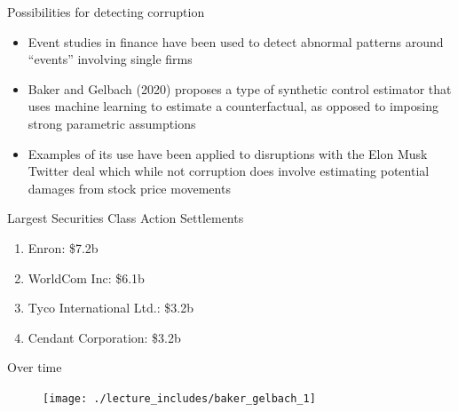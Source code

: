 \documentclass{beamer}
\begin{document}
\begin{frame}{Possibilities for detecting corruption}

\begin{itemize}

\item Event studies in finance have been used to detect abnormal patterns around ``events'' involving single firms
\item Baker and Gelbach (2020) proposes a type of synthetic control estimator that uses machine learning to estimate a counterfactual, as opposed to imposing strong parametric assumptions
\item Examples of its use have been applied to disruptions with the Elon Musk Twitter deal which while not corruption does involve estimating potential damages from stock price movements

\end{itemize}

\end{frame}

\begin{frame}{Largest Securities Class Action Settlements}

\begin{enumerate}

\item Enron: \$7.2b
\item WorldCom Inc: \$6.1b
\item Tyco International Ltd.: \$3.2b
\item Cendant Corporation: \$3.2b

\end{enumerate}

\end{frame}

\begin{frame}{Over time}

\begin{figure}
\texttt{[image: ./lecture\_includes/baker\_gelbach\_1]}
\end{figure}
\end{frame}
\end{document}
